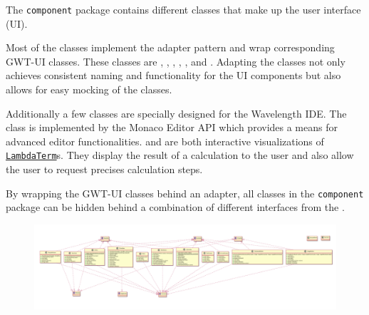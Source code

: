 The \texttt{component} package contains different classes that make up the user interface (UI).

Most of the classes implement the adapter pattern and wrap corresponding GWT-UI classes. 
These classes are \texttt{}, \texttt{}, \texttt{}, 
\texttt{}, \texttt{}, \texttt{} and \texttt{}.
Adapting the classes not only achieves consistent naming and functionality for the UI components
but also allows for easy mocking of the classes.

Additionally a few classes are specially designed for the Wavelength IDE. The \texttt{} 
class is implemented by the Monaco Editor API which provides a means for advanced editor functionalities. 
\texttt{} and \texttt{} are both interactive visualizations of 
\texttt{\hyperref[type:edu.kit.wavelength.client.model.term.LambdaTerm]{LambdaTerm}}s. They display 
the result of a calculation to the user and also allow the user to request precises calculation steps.

By wrapping the GWT-UI classes behind an adapter, all classes in the \texttt{component} package can
be hidden behind a combination of different interfaces from the \texttt{}.

\begin{figure}[H]
	\centering
	\includegraphics[width=\textwidth]{packageDiagrams/componentsPackage}
\end{figure}
